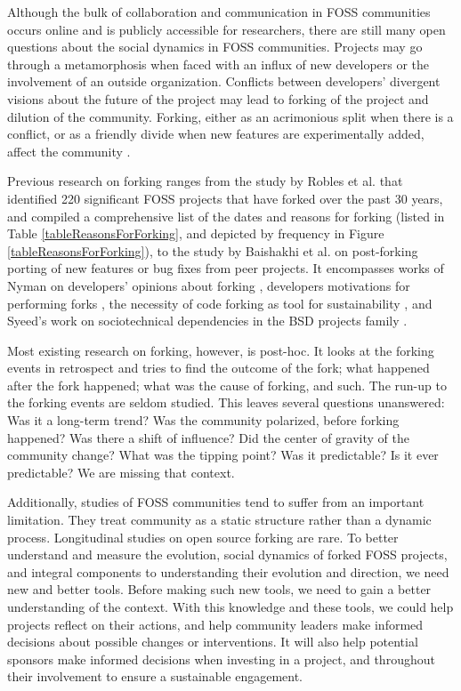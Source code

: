 \documentclass[12pt]{report}
\begin{document}
Although the bulk of collaboration and communication in FOSS communities occurs online and is publicly accessible for researchers, there are still many open questions about the social dynamics in FOSS communities. Projects may go through a metamorphosis when faced with an influx of new developers or the involvement of an outside organization. Conflicts between developers' divergent visions about the future of the project may lead to forking of the project and dilution of the community. Forking, either as an acrimonious split when there is a conflict, or as a friendly divide when new features are experimentally added, affect the community \cite{Bezrukova}.

Previous research on forking ranges from the study by Robles et al. \cite{Robles} that identified 220 significant FOSS projects that have forked over the past 30 years, and compiled a comprehensive list of the dates and reasons for forking (listed in Table \ref{tableReasonsForForking}, and depicted by frequency in Figure \ref{tableReasonsForForking}), to the study by Baishakhi et al. \cite{Baishakhi} on post-forking porting of new features or bug fixes from peer projects. It encompasses works of Nyman on developers' opinions about forking \cite{NymanHackersForking}, developers motivations for performing forks \cite{NymanToForkOrNotToFork}, the necessity of code forking as tool for sustainability \cite{NymanForkingSustainability}, and Syeed's work on sociotechnical dependencies in the BSD projects family \cite{Syeed}.

Most existing research on forking, however, is post-hoc. It looks at the forking events in retrospect and tries to find the outcome of the fork; what happened after the fork happened; what was the cause of forking, and such. The run-up to the forking events are seldom studied. This leaves several questions unanswered: Was it a long-term trend? Was the community polarized, before forking happened? Was there a shift of influence? Did the center of gravity of the community change? What was the tipping point? Was it predictable? Is it ever predictable? We are missing that context. 

Additionally, studies of FOSS communities tend to suffer from an important limitation. They treat community as a static structure rather than a dynamic process. Longitudinal studies on open source forking are rare. To better understand and measure the evolution, social dynamics of forked FOSS projects, and integral components to understanding their evolution and direction, we need new and better tools. Before making such new tools, we need to gain a better understanding of the context. With this knowledge and these tools, we could help projects reflect on their actions, and help community leaders make informed decisions about possible changes or interventions. It will also help potential sponsors make informed decisions when investing in a project, and throughout their involvement to ensure a sustainable engagement. 
\end{document}
